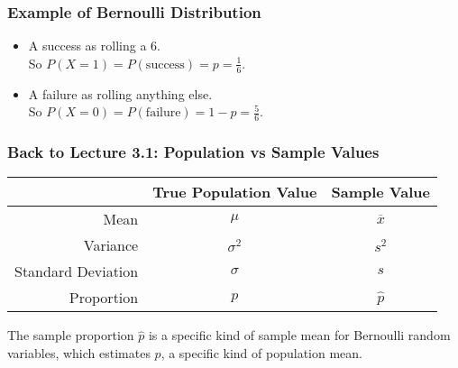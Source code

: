 \documentclass[slides]{beamer}
\newcommand{\blue}[1]{\textcolor{blue2}{#1}}
\begin{document}
\begin{frame}[fragile]
\frametitle{Example of Bernoulli Distribution}

\begin{itemize}
\pause\item A success as rolling a 6.\\
So $P(X=1) = P(\mbox{success}) = p =  \frac{1}{6}$.
\pause\item A failure as rolling anything else.\\
So $P(X=0) = P(\mbox{failure}) = 1-p = \frac{5}{6}$.
\end{itemize}

\end{frame}


\begin{frame}[fragile]
\frametitle{Back to Lecture 3.1: Population vs Sample Values}

\begin{center}
  \begin{tabular}{r|cc}
	\hline	
     & True Population Value & Sample Value \\ 
	\hline	
    Mean & $\mu$ & $\overline{x}$ \\ 
    Variance & $\sigma^2$ & $s^2$ \\ 
    Standard Deviation & $\sigma$ & $s$ \\ 
    \blue{Proportion} & \blue{$p$} & \blue{$\widehat{p}$} \\
	\hline	
  \end{tabular}
\end{center}

\vspace{0.5cm}

\pause The \blue{sample proportion $\widehat{p}$} is a specific kind of \blue{sample mean} for Bernoulli random variables, which \blue{estimates $p$}, a specific kind of population mean.  

\end{frame}
\end{document}
